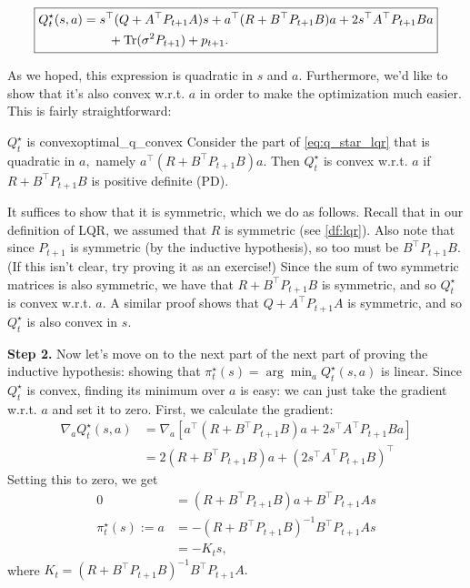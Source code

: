 \documentclass[../main/main]{subfiles}
\begin{document}
\begin{equation}
    \boxed{
        \begin{aligned}
            Q^\star_t(s, a) &= s^\top (Q + A^\top P_{t+1} A) s + a^\top (R + B^\top P_{t+1} B) a
            + 2s^\top A^\top P_{t+1} B a \\
            &\qquad + \operatorname*{\textrm{Tr}}(\sigma^2 P_{t+1}) + p_{t+1}.
        \end{aligned}
    }
    \label{eq:q_star_lqr}
\end{equation}

As we hoped, this expression is quadratic in $s$ and $a$.
Furthermore, we'd like to show that it's also convex w.r.t. $a$ in order to make the optimization much easier.
This is fairly straightforward:

\begin{theorem}{$Q^\star_t$ is convex}{optimal_q_convex}
    Consider the part of \autoref{eq:q_star_lqr} that is quadratic in $a,$ namely
    $a^\top (R + B^\top P_{t+1} B) a.$ Then $Q^\star_t$ is convex w.r.t. $a$
    if $R + B^\top P_{t+1} B$ is positive definite (PD).
    
    It suffices to show that it is symmetric, which we do as follows. Recall that in our definition of LQR,
    we assumed that $R$ is symmetric (see \autoref{df:lqr}).
    Also note that since $P_{t+1}$ is symmetric (by the inductive hypothesis), so too must be $B^\top P_{t+1} B.$ (If this isn't clear, try proving it as an exercise!)
    Since the sum of two symmetric matrices is also symmetric, we have that $R + B^\top P_{t+1} B$ is symmetric,
    and so $Q^\star_t$ is convex w.r.t. $a.$ A similar proof shows that $Q + A^\top P_{t+1} A$ is symmetric, and so $Q^\star_t$ is also convex in $s.$
\end{theorem}

\textbf{Step 2.} Now let's move on to the next part of the next part of proving the inductive hypothesis:
showing that $\pi^\star_t(s) = \arg \min_a Q^\star_t(s, a)$ is linear.
Since $Q^\star_t$ is convex, finding its minimum over $a$ is easy:
we can just take the gradient w.r.t. $a$ and set it to zero.
First, we calculate the gradient:
\begin{align*}
    \nabla_a Q^\star_t(s, a) &= \nabla_a [ a^\top (R + B^\top P_{t+1} B) a + 2 s^\top A^\top P_{t+1} B a ] \\
    &= 2 (R + B^\top P_{t+1} B) a + (2 s^\top A^\top P_{t+1} B)^\top
\end{align*}
Setting this to zero, we get \begin{align}
    0 &= (R + B^\top P_{t+1} B) a + B^\top P_{t+1} A s \nonumber \\
    \pi^\star_t(s) := a &= -(R + B^\top P_{t+1} B)^{-1} B^\top P_{t+1} A s \nonumber \\
    &= - K_t s,
\end{align}
where $K_t = (R + B^\top P_{t+1} B)^{-1} B^\top P_{t+1} A.$
\end{document}
